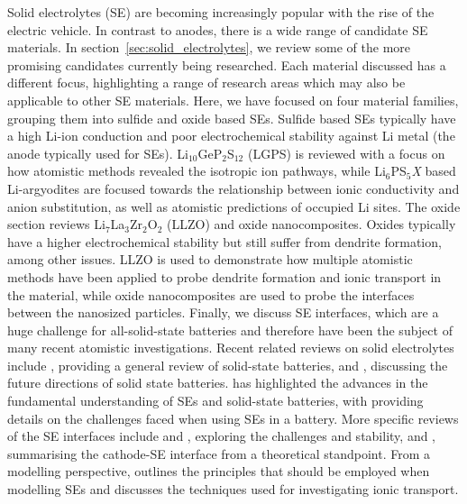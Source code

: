 \documentclass[../main.tex]{subfiles}
\begin{document}
Solid electrolytes (SE) are becoming increasingly popular with the rise of the electric vehicle.\cite{Woods_2021} In contrast to anodes, there is a wide range of candidate SE materials. In section~\ref{sec:solid_electrolytes}, we review some of the more promising candidates currently being researched. Each material discussed has a different focus, highlighting a range of research areas which may also be applicable to other SE materials. Here, we have focused on four material families, grouping them into sulfide and oxide based SEs. Sulfide based SEs typically have a high Li-ion conduction and poor electrochemical stability against Li metal (the anode typically used for SEs). \cite{Zhu2015, Zhang2019se_rev} Li$_{10}$GeP$_2$S$_{12}$ (LGPS) is reviewed with a focus on how atomistic methods revealed the isotropic ion pathways, while Li$_6$PS$_5$\textit{X} based Li-argyodites are focused towards the relationship between ionic conductivity and anion substitution, as well as atomistic predictions of occupied Li sites. The oxide section reviews Li$_7$La$_3$Zr$_2$O$_2$ (LLZO) and oxide nanocomposites. Oxides typically have a higher electrochemical stability but still suffer from dendrite formation, among other issues.\cite{Zhu2015} LLZO is used to demonstrate how multiple atomistic methods have been applied to probe dendrite formation and ionic transport in the material, while oxide nanocomposites are used to probe the interfaces between the nanosized particles. Finally, we discuss SE interfaces, which are a huge challenge for all-solid-state batteries and therefore have been the subject of many recent atomistic investigations. Recent related reviews on solid electrolytes include \citeauthor{Sun2017se_review} \cite{Sun2017se_review}, providing a general review of solid-state batteries, and \citeauthor{Zhang2018se_review}, \cite{Zhang2018se_review} discussing the future directions of solid state batteries. \citeauthor{famprikis_fundamentals_2019} \cite{famprikis_fundamentals_2019} has highlighted the advances in the fundamental understanding of SEs and solid-state batteries, with \citeauthor{Gurung2019} \cite{Gurung2019} providing details on the challenges faced when using SEs in a battery. More specific reviews of the SE interfaces include \citeauthor{Xu2018exp} \cite{Xu2018exp} and \citeauthor{Xiao2020interfacerev} \cite{Xiao2020interfacerev}, exploring the challenges and stability, and \citeauthor{Tateyama2019} \cite{Tateyama2019}, summarising the cathode-SE interface from a theoretical standpoint. From a modelling perspective, \citeauthor{Ceder2018} \cite{Ceder2018} outlines the principles that should be employed when modelling SEs and \citeauthor{Gao2020_ion_transport} \cite{Gao2020_ion_transport} discusses the techniques used for investigating ionic transport.
\end{document}
